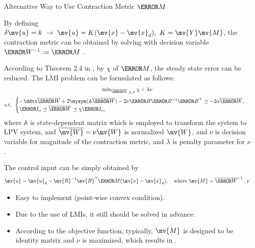 \begin{frame}{Alternative Way to Use Contraction Metric $\mm{M}$}

    By defining $\delta\mv{u} = k\  \rightarrow\  \mv{u} = K(\mv{x}-\mv{x}_d), \ K = \mv{Y}\mv{M}$, the contraction metric can be obtained by solving  with decision variable $\mm{W}^{-1}:=\mm{M}$ \cite{Tsukamoto:2021ac}.

    According to Theorem 2.4 in \cite{Tsukamoto:2021aa}, by  $\chi$ of $\mm{M}$, the steady state error can be reduced.
    The LMI problem can be formulated as follows:
\begin{equation} \label{eq:opt:conv:lmi}
   \begin{matrix}
      \min_{
         \overline{\mm{W}},\chi,\nu
         } 
      \chi + \lambda \nu
      \\ 
      \vspace{-.2cm}
      \\
      \text{s.t. }
      \begin{cases}
         -
         \ddtt\overline{\mm{W}}
         +
         2\mysym(
            \mathbb{A}\overline{\mm{W}}
         )
         -
         2\nu\mm{B}\mm{R}^{-1} \mm{B}^\top 
         \preceq
         -2\alpha\overline{\mm{W}}
         ,
         \\
         \mm{I}_n
         \preceq
         \overline{\mm{W}}
         \preceq
         \chi \mm{I}_n
         ,
      \end{cases}
   \end{matrix}
\end{equation} 
    where $\mathbb{A}$ is state-dependent matrix which is employed to transform the system to LPV system, and $\overline{\mv{W}} = \nu \mv{W}$ is normalized $\mv{W}$, and $\nu$ is decision variable for magnitude of the contraction metric, and $\lambda$ is penalty parameter for $\nu$.
    
    \hfill

    The control input can be simply obtained by
    \begin{equation}
        \mv{u} = \mv{u}_d - \mv{R}^{-1}\mv{B}^\top \mm{M}(\mv{x}-\mv{x}_d)
         ,\quad
         \text{where } \mv{M} = \overline{\mm{W}}^{-1} \cdot \nu
    \end{equation}

    \hfill

    \begin{itemize}
        \item Easy to implement (point-wise convex condition).
        \item Due to the use of LMIs, it still should be solved in advance.
        \item According to the objective function, typically, $\mv{M}$ is designed to be identity matrix and $\nu$ is maximized, which results in .
    \end{itemize}

\end{frame}

